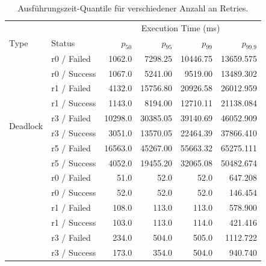 \begin{table}[htbp]
	\centering
	\caption{Ausführungszeit-Quantile für verschiedener Anzahl an Retries.}
	\label{tab:r-quantiles}
	\scriptsize
	\setlength{\tabcolsep}{4pt}
	\begin{tabular}{llrrrr}
		\toprule
		& & \multicolumn{4}{c}{Execution Time (ms)} \\
		Type & Status & $p_{50}$ & $p_{95}$ & $p_{99}$ & $p_{99.9}$ \\
		\midrule

		\multirow{10}{*}{Deadlock}
		& r0 / Failed
		& 1062.0 & 7298.25 & 10446.75 & 13659.575 \\
		& r0 / Success
		& 1067.0 & 5241.00 & 9519.00 & 13489.302 \\

		& r1 / Failed
		& 4132.0 & 15756.80 & 20926.58 & 26012.959 \\
		& r1 / Success
		& 1143.0 & 8194.00 & 12710.11 & 21138.084 \\

		& r3 / Failed
		& 10298.0 & 30385.05 & 39140.69 & 46052.909 \\
		& r3 / Success
		& 3051.0 & 13570.05 & 22464.39 & 37866.410 \\

		& r5 / Failed
		& 16563.0 & 45267.00 & 55663.32 & 65275.111 \\
		& r5 / Success
		& 4052.0 & 19455.20 & 32065.08 & 50482.674 \\

		\midrule

		\multirow{10}{*}{Serialization}
		& r0 / Failed
		& 51.0 & 52.0 & 52.0 & 647.208 \\
		& r0 / Success
		& 52.0 & 52.0 & 52.0 & 146.454 \\

		& r1 / Failed
		& 108.0 & 113.0 & 113.0 & 578.900 \\
		& r1 / Success
		& 103.0 & 113.0 & 114.0 & 421.416 \\

		& r3 / Failed
		& 234.0 & 504.0 & 505.0 & 1112.722 \\
		& r3 / Success
		& 173.0 & 354.0 & 504.0 & 940.740 \\


\end{tabular}
\end{table}
